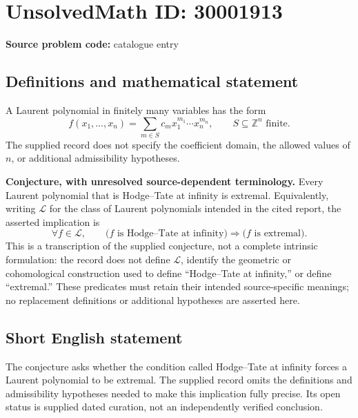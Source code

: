 \documentclass[11pt]{article}
\newcommand{\Z}{\mathbb{Z}}
\begin{document}
\section*{UnsolvedMath ID: 30001913}
\textbf{Source problem code:} catalogue entry
\subsection{Definitions and mathematical statement}
A Laurent polynomial in finitely many variables has the form
\[
f(x_1,\ldots,x_n)=\sum_{m\in S}c_m x_1^{m_1}\cdots x_n^{m_n},\qquad S\subseteq\Z^n\text{ finite}.
\]
The supplied record does not specify the coefficient domain, the allowed values of \(n\), or additional admissibility hypotheses.

\textbf{Conjecture, with unresolved source-dependent terminology.} Every Laurent polynomial that is Hodge--Tate at infinity is extremal. Equivalently, writing \(\mathcal L\) for the class of Laurent polynomials intended in the cited report, the asserted implication is
\[
\forall f\in\mathcal L,\qquad
\bigl(f\text{ is Hodge--Tate at infinity}\bigr)
\Longrightarrow
\bigl(f\text{ is extremal}\bigr).
\]
This is a transcription of the supplied conjecture, not a complete intrinsic formulation: the record does not define \(\mathcal L\), identify the geometric or cohomological construction used to define ``Hodge--Tate at infinity,'' or define ``extremal.'' These predicates must retain their intended source-specific meanings; no replacement definitions or additional hypotheses are asserted here.
\subsection{Short English statement}
The conjecture asks whether the condition called Hodge--Tate at infinity forces a Laurent polynomial to be extremal. The supplied record omits the definitions and admissibility hypotheses needed to make this implication fully precise. Its open status is supplied dated curation, not an independently verified conclusion.
\end{document}
